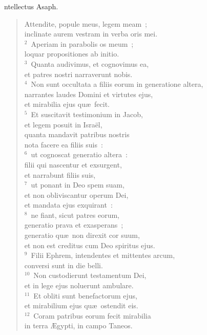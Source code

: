 \bchapter
{}ntellectus Asaph. \begin{flushleft}\begin{verse}\vspace{6pt}Attendite, popule meus, legem meam~;\\ inclinate aurem vestram in verba oris mei.\\
${}^{2}$~Aperiam in parabolis os meum~;\\ loquar propositiones ab initio.\\
${}^{3}$~Quanta audivimus, et cognovimus ea,\\ et patres nostri narraverunt nobis.\\
${}^{4}$~Non sunt occultata a filiis eorum in generatione altera,\\ narrantes laudes Domini et virtutes ejus,\\ et mirabilia ejus qu\ae\ fecit.\\
${}^{5}$~Et suscitavit testimonium in Jacob,\\ et legem posuit in Isra\"el,\\ quanta mandavit patribus nostris\\ nota facere ea filiis suis~:\\
${}^{6}$~ut cognoscat generatio altera~:\\ filii qui nascentur et exsurgent,\\ et narrabunt filiis suis,\\
${}^{7}$~ut ponant in Deo spem suam,\\ et non obliviscantur operum Dei,\\ et mandata ejus exquirant~:\\
${}^{8}$~ne fiant, sicut patres eorum,\\ generatio prava et exasperans~;\\ generatio qu\ae\ non direxit cor suum,\\ et non est creditus cum Deo spiritus ejus.\\
${}^{9}$~Filii Ephrem, intendentes et mittentes arcum,\\ conversi sunt in die belli.\\
${}^{10}$~Non custodierunt testamentum Dei,\\ et in lege ejus noluerunt ambulare.\\
${}^{11}$~Et obliti sunt benefactorum ejus,\\ et mirabilium ejus qu\ae\ ostendit eis.\\
${}^{12}$~Coram patribus eorum fecit mirabilia\\ in terra \AE gypti, in campo Taneos.\\

\end{verse}
\end{flushleft}
